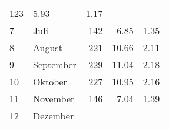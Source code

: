 \begin{longtable}{lXrrr}
       \num{123} &
       \num[round-mode=places,round-precision=2]{5.93} &
         \num[round-mode=places,round-precision=2]{1.17} \\

     7 &
     \multicolumn{1}{X}{ Juli   } &


       \num{142} &
       \num[round-mode=places,round-precision=2]{6.85} &
         \num[round-mode=places,round-precision=2]{1.35} \\

     8 &
     \multicolumn{1}{X}{ August   } &


       \num{221} &
       \num[round-mode=places,round-precision=2]{10.66} &
         \num[round-mode=places,round-precision=2]{2.11} \\

     9 &
     \multicolumn{1}{X}{ September   } &


       \num{229} &
       \num[round-mode=places,round-precision=2]{11.04} &
         \num[round-mode=places,round-precision=2]{2.18} \\

     10 &
     \multicolumn{1}{X}{ Oktober   } &


       \num{227} &
       \num[round-mode=places,round-precision=2]{10.95} &
         \num[round-mode=places,round-precision=2]{2.16} \\

     11 &
     \multicolumn{1}{X}{ November   } &


       \num{146} &
       \num[round-mode=places,round-precision=2]{7.04} &
         \num[round-mode=places,round-precision=2]{1.39} \\

     12 &
     \multicolumn{1}{X}{ Dezember   } &



\end{longtable}
